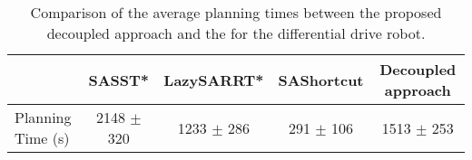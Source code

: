 \begin{table}[]
    \begin{tabular}{l|c|c|c|c|}
        \cline{2-5}
                                                & SASST* & LazySARRT* & SAShortcut & Decoupled approach \\ \hline
        \multicolumn{1}{|l|}{Planning Time (s)} &   2148 $\pm$ 320    &    1233 $\pm$ 286       &    291 $\pm$ 106         &        1513 $\pm$ 253           \\ \hline
    \end{tabular}
    \caption{
        \label{tab:lazySAMP_unic}
        Comparison of the average planning times between the proposed decoupled approach and the  for the differential drive robot.
    }
\end{table}